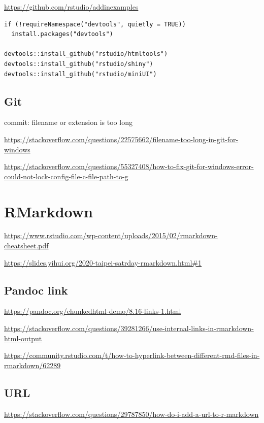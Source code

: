 \documentclass[
]{book}
\theoremstyle{definition}
\theoremstyle{definition}
\theoremstyle{definition}
\theoremstyle{definition}
\theoremstyle{remark}
\begin{document}
\url{https://github.com/rstudio/addinexamples}

\begin{verbatim}
if (!requireNamespace("devtools", quietly = TRUE))
  install.packages("devtools")
  
devtools::install_github("rstudio/htmltools")
devtools::install_github("rstudio/shiny")
devtools::install_github("rstudio/miniUI")
\end{verbatim}

\hypertarget{git}{%
\subsection{Git}\label{git}}

commit: filename or extension is too long

\url{https://stackoverflow.com/questions/22575662/filename-too-long-in-git-for-windows}

\url{https://stackoverflow.com/questions/55327408/how-to-fix-git-for-windows-error-could-not-lock-config-file-c-file-path-to-g}

\hypertarget{rmarkdown}{%
\section{RMarkdown}\label{rmarkdown}}

\url{https://www.rstudio.com/wp-content/uploads/2015/02/rmarkdown-cheatsheet.pdf}

\url{https://slides.yihui.org/2020-taipei-satrday-rmarkdown.html\#1}

\hypertarget{pandoc-link}{%
\subsection{Pandoc link}\label{pandoc-link}}

\url{https://pandoc.org/chunkedhtml-demo/8.16-links-1.html}

\url{https://stackoverflow.com/questions/39281266/use-internal-links-in-rmarkdown-html-output}

\url{https://community.rstudio.com/t/how-to-hyperlink-between-different-rmd-files-in-rmarkdown/62289}

\hypertarget{url}{%
\subsection{URL}\label{url}}

\url{https://stackoverflow.com/questions/29787850/how-do-i-add-a-url-to-r-markdown}
\end{document}
